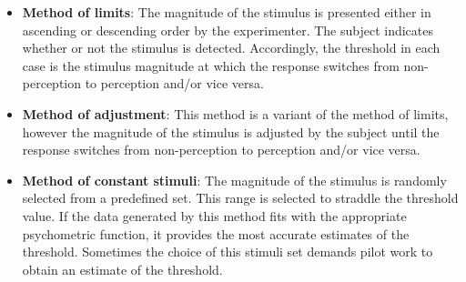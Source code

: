 \begin{itemize}

	\item \textbf{Method of limits}: The magnitude of the stimulus is presented either in ascending or descending order by the experimenter.
	The subject indicates whether or not the stimulus is detected. Accordingly, the threshold in each case is the stimulus magnitude at which the response switches from non-perception to perception and/or vice versa. \cite{Kingdom2016}
	\item \textbf{Method of adjustment}: This method is a variant of the method of limits, however the magnitude of the stimulus is adjusted by the subject until the response switches from non-perception to perception and/or vice versa. \cite{Kingdom2016} %
	\item \textbf{Method of constant stimuli}: The magnitude of the stimulus is randomly selected from a predefined set. This range is selected to straddle the threshold value. If the data generated by this method fits with the appropriate psychometric function, it provides the most accurate estimates of the threshold. Sometimes the  choice of this stimuli set demands pilot work to obtain an estimate of the threshold. \cite{Kingdom2016}
\end{itemize}
